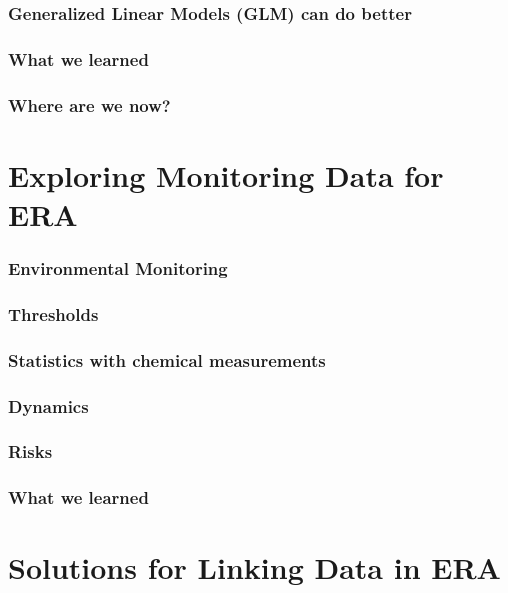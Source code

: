\documentclass[10pt
	]{beamer}
\begin{document}
\begin{frame}
\frametitle{Generalized Linear Models (GLM) can do better}

\end{frame}



\begin{frame}
\frametitle{What we learned}

\end{frame}


\begin{frame}
\frametitle{Where are we now?}

\end{frame}

\section{Exploring Monitoring Data for ERA}

\begin{frame}
\frametitle{Environmental Monitoring}

\end{frame}

\begin{frame}
\frametitle{Thresholds}

\end{frame}

\begin{frame}
\frametitle{Statistics with chemical measurements}

\end{frame}


\begin{frame}
\frametitle{Dynamics}

\end{frame}


\begin{frame}
\frametitle{Risks}

\end{frame}


\begin{frame}
\frametitle{What we learned}

\end{frame}

\section{Solutions for Linking Data in ERA}
\end{document}
